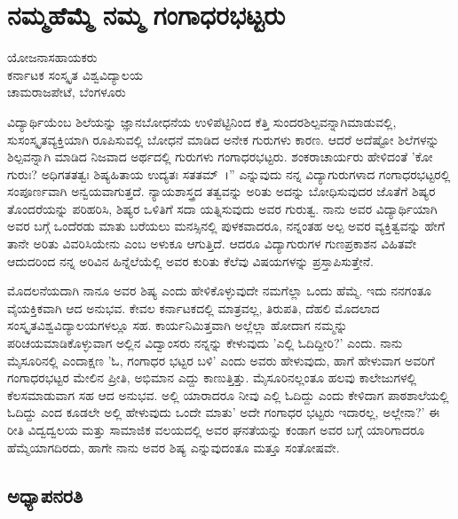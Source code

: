 \chapter{ನಮ್ಮಹೆಮ್ಮೆ ನಮ್ಮ ಗಂಗಾಧರಭಟ್ಟರು}

\begin{center}
\smallskip
ಯೋಜನಾಸಹಾಯಕರು\\
ಕರ್ನಾಟಕ ಸಂಸ್ಕೃತ ವಿಶ್ವವಿದ್ಯಾಲಯ\\
ಚಾಮರಾಜಪೇಟೆ, ಬೆಂಗಳೂರು
\addrule
\end{center}

ವಿದ್ಯಾರ್ಥಿಯೆಂಬ ಶಿಲೆಯನ್ನು ಜ್ಞಾನಬೋಧನೆಯ ಉಳಿಪೆಟ್ಟಿನಿಂದ ಕೆತ್ತಿ ಸುಂದರಶಿಲ್ಪವನ್ನಾಗಿಮಾಡುವಲ್ಲಿ, ಸುಸಂಸ್ಕೃತವ್ಯಕ್ತಿಯಾಗಿ ರೂಪಿಸುವಲ್ಲಿ ಬೋಧನೆ ಮಾಡಿದ ಅನೇಕ ಗುರುಗಳು ಕಾರಣ. ಆದರೆ ಅದೆಷ್ಟೋ ಶಿಲೆಗಳನ್ನು ಶಿಲ್ಪವನ್ನಾಗಿ ಮಾಡಿದ ನಿಜವಾದ ಅರ್ಥದಲ್ಲಿ ಗುರುಗಳು ಗಂಗಾಧರಭಟ್ಟರು. ಶಂಕರಾಚಾರ್ಯರು ಹೇಳಿದಂತೆ ’ಕೋ ಗುರುಃ? ಅಧಿಗತತತ್ವಃ ಶಿಷ್ಯಹಿತಾಯ ಉದ್ಯತಃ ಸತತಮ್~।” ಎನ್ನುವುದು ನನ್ನ ವಿದ್ಯಾಗುರುಗಳಾದ ಗಂಗಾಧರಭಟ್ಟರಲ್ಲಿ ಸಂಪೂರ್ಣವಾಗಿ ಅನ್ವಯವಾಗುತ್ತದೆ. ನ್ಯಾಯಶಾಸ್ತ್ರದ ತತ್ವವನ್ನು ಅರಿತು ಅದನ್ನು ಬೋಧಿಸುವುದರ ಜೊತೆಗೆ ಶಿಷ್ಯರ ತೊಂದರೆಯನ್ನು ಪರಿಹರಿಸಿ, ಶಿಷ್ಯರ ಒಳಿತಿಗೆ ಸದಾ ಯತ್ನಿಸುವುದು ಅವರ ಗುರುತ್ವ. ನಾನು ಅವರ ವಿದ್ಯಾರ್ಥಿಯಾಗಿ ಅವರ ಬಗ್ಗೆ ಒಂದೆರಡು ಮಾತು ಬರೆಯಲು ಮನಸ್ಸಿನಲ್ಲಿ ಪುಳಕವಾದರೂ, ನನ್ನಂತಹ ಅಲ್ಪ ಅವರ ವ್ಯಕ್ತಿತ್ವವನ್ನು ಹೇಗೆ ತಾನೇ ಅರಿತು ವಿವರಿಸಿಯೇನು ಎಂಬ ಅಳುಕೂ ಆಗುತ್ತಿದೆ. ಆದರೂ ವಿದ್ಯಾಗುರುಗಳ ಗುಣಪ್ರಕಾಶನ ವಿಹಿತವೇ ಆದುದರಿಂದ ನನ್ನ ಅರಿವಿನ ಹಿನ್ನೆಲೆಯೆಲ್ಲಿ ಅವರ ಕುರಿತು ಕೆಲೆವು ವಿಷಯಗಳನ್ನು ಪ್ರಸ್ತಾಪಿಸುತ್ತೇನೆ.

ಮೊದಲನೆಯದಾಗಿ ನಾನೂ ಅವರ ಶಿಷ್ಯ ಎಂದು ಹೇಳಿಕೊಳ್ಳುವುದೇ ನಮಗೆಲ್ಲಾ ಒಂದು ಹೆಮ್ಮೆ. ಇದು ನನಗಂತೂ ವೈಯಕ್ತಿಕವಾಗಿ ಆದ ಅನುಭವ. ಕೇವಲ ಕರ್ನಾಟಕದಲ್ಲಿ ಮಾತ್ರವಲ್ಲ, ತಿರುಪತಿ, ದೆಹಲಿ ಮೊದಲಾದ ಸಂಸ್ಕೃತವಿಶ್ವವಿದ್ಯಾಲಯಗಳಲ್ಲೂ ಸಹ. ಕಾರ್ಯನಿಮಿತ್ತವಾಗಿ ಅಲ್ಲೆಲ್ಲಾ ಹೋದಾಗ ನಮ್ಮನ್ನು ಪರಿಚಯಮಾಡಿಕೊಳ್ಳುವಾಗ ಅಲ್ಲಿನ ವಿದ್ವಾಂಸರು ನನ್ನನ್ನು ಕೇಳುವುದು ’ಎಲ್ಲಿ ಓದಿದ್ದೀರಿ?’ ಎಂದು. ನಾನು ಮೈಸೂರಿನಲ್ಲಿ ಎಂದಾಕ್ಷಣ ’ಓ, ಗಂಗಾಧರ ಭಟ್ಟರ ಬಳಿ’ ಎಂದು ಅವರು ಹೇಳುವುದು, ಹಾಗೆ ಹೇಳುವಾಗ ಅವರಿಗೆ ಗಂಗಾಧರಭಟ್ಟರ ಮೇಲಿನ ಪ್ರೀತಿ, ಅಭಿಮಾನ ಎದ್ದು ಕಾಣುತ್ತಿತ್ತು. ಮೈಸೂರಿನಲ್ಲಂತೂ ಹಲವು ಕಾಲೇಜುಗಳಲ್ಲಿ ಕೆಲಸಮಾಡುವಾಗ ಸಹ ಆದ ಅನುಭವ. ಅಲ್ಲಿ ಯಾರಾದರೂ ನೀವು ಎಲ್ಲಿ ಓದಿದ್ದು ಎಂದು ಕೇಳಿದಾಗ ಪಾಠಶಾಲೆಯಲ್ಲಿ ಓದಿದ್ದು ಎಂದ ಕೂಡಲೇ ಅಲ್ಲಿ ಹೇಳುವುದು ಒಂದೇ ಮಾತು’ ಅದೇ ಗಂಗಾಧರ ಭಟ್ಟರು ಇದಾರಲ್ಲ, ಅಲ್ಲೇನಾ?’ ಈ ರೀತಿ ವಿದ್ವದ್ವಲಯ ಮತ್ತು ಸಾಮಾಜಿಕ ವಲಯದಲ್ಲಿ ಅವರ ಘನತೆಯನ್ನು ಕಂಡಾಗ ಅವರ ಬಗ್ಗೆ ಯಾರಿಗಾದರೂ ಹೆಮ್ಮೆಯಾಗದಿರದು, ಹಾಗೇ ನಾನು ಅವರ ಶಿಷ್ಯ ಎನ್ನುವುದಂತೂ ಮತ್ತೂ ಸಂತೋಷವೇ.

\section*{ಅಧ್ಯಾಪನರತಿ}

